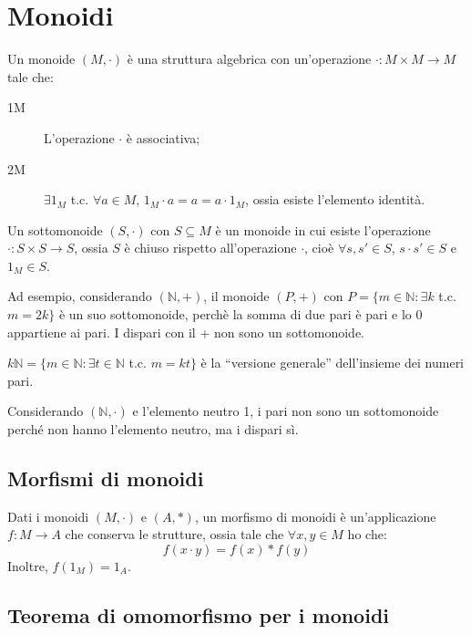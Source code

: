 \section{Monoidi}

Un monoide $(M, \cdot)$ \`e una struttura algebrica con un'operazione $\cdot : M \times M \to M$ tale che:
\begin{description}
    \item[1M] L'operazione $\cdot$ \`e associativa;
    \item[2M] $\exists 1_M $ t.c. $ \forall a \in M$, $ 1_M \cdot a = a = a \cdot 1_M$, ossia esiste l'elemento identit\`a. 
\end{description}

Un sottomonoide $(S, \cdot)$ con $S \subseteq M$ \`e un monoide in cui esiste l'operazione $\cdot : S \times S \to S$, ossia $S$ \`e chiuso rispetto all'operazione $\cdot$, cio\`e $\forall s, s' \in S $, $s \cdot s' \in S$ e $1_M \in S$.

Ad esempio, considerando $(\mathbb{N}, +)$, il monoide $(P, +)$ con $P = \{ m \in \mathbb{N} : \exists k $ t.c. $m = 2k \}$ \`e un suo sottomonoide, perch\`e la somma di due pari \`e pari e lo 0 appartiene ai pari. I dispari con il + non sono un sottomonoide.

$k \mathbb{N} = \{ m \in \mathbb{N} : \exists t \in \mathbb{N} $ t.c. $ m = k t\}$ \`e la ``versione generale'' dell'insieme dei numeri pari.

Considerando $(\mathbb{N}, \cdot)$ e l'elemento neutro 1, i pari non sono un sottomonoide perch\'e non hanno l'elemento neutro, ma i dispari s\`i.

\subsection{Morfismi di monoidi}

\begin{defn}
Dati i monoidi $(M, \cdot)$ e $(A, \ast)$, un morfismo di monoidi \`e un'applicazione $f : M \to A$ che conserva le strutture, ossia tale che $\forall x,y \in M $ ho che:
\[
f(x \cdot y) = f(x) \ast f(y)
\]
Inoltre, $f(1_M) = 1_A$.
\end{defn}

\subsection{Teorema di omomorfismo per i monoidi\label{omomorfismo_monoidi}}

